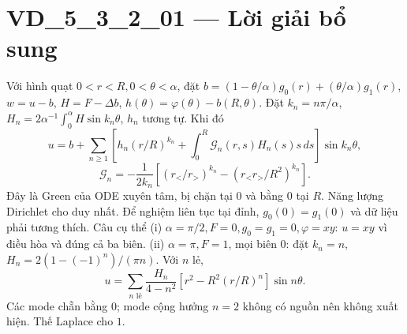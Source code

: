 \documentclass[10pt,a4paper]{article}
\begin{document}
\section*{VD\_5\_3\_2\_01 — Lời giải bổ sung}
Với hình quạt $0<r<R,0<\theta<\alpha$, đặt $b=(1-\theta/\alpha)g_0(r)+(\theta/\alpha)g_1(r)$, $w=u-b$, $H=F-\Delta b$, $h(\theta)=\varphi(\theta)-b(R,\theta)$. Đặt $k_n=n\pi/\alpha$, $H_n=2\alpha^{-1}\int_0^\alpha H\sin k_n\theta$, $h_n$ tương tự. Khi đó
\[u=b+\sum_{n\ge1}\left[h_n(r/R)^{k_n}+\int_0^R\mathcal G_n(r,s)H_n(s)s\,ds\right]\sin k_n\theta,\]
\[\mathcal G_n=-\frac1{2k_n}\left[(r_</r_>)^{k_n}-(r_<r_>/R^2)^{k_n}\right].\]
Đây là Green của ODE xuyên tâm, bị chặn tại 0 và bằng 0 tại $R$. Năng lượng Dirichlet cho duy nhất. Để nghiệm liên tục tại đỉnh, $g_0(0)=g_1(0)$ và dữ liệu phải tương thích.
Câu cụ thể (i) $\alpha=\pi/2,F=0,g_0=g_1=0,\varphi=xy$: $u=xy$ vì điều hòa và đúng cả ba biên. (ii) $\alpha=\pi,F=1$, mọi biên 0: đặt $k_n=n$, $H_n=2(1-(-1)^n)/(\pi n)$. Với $n$ lẻ,
\[u=\sum_{n\text{ lẻ}}\frac{H_n}{4-n^2}[r^2-R^2(r/R)^n]\sin n\theta.\]
Các mode chẵn bằng 0; mode cộng hưởng $n=2$ không có nguồn nên không xuất hiện. Thế Laplace cho $1$.
\end{document}
